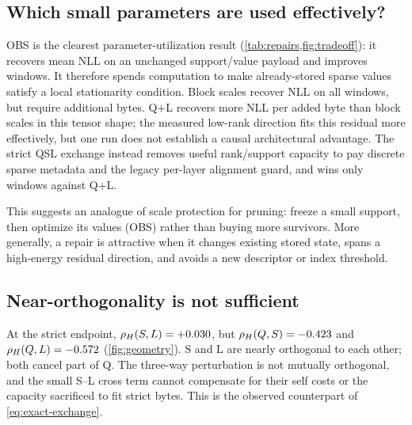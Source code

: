 \subsection{Which small parameters are used effectively?}

\begin{table}[t]
  \caption{Paired repair effects in the same bounded run.  Positive recovery
  favors the left method.  Intervals are descriptive over fixed windows.}
  \label{tab:repairs}
  \centering
  \resizebox{\columnwidth}{!}{}
\end{table}

OBS is the clearest parameter-utilization result
(\cref{tab:repairs,fig:tradeoff}): it recovers \OBSRecovery{} mean NLL on an
unchanged support/value payload and improves \OBSWins{} windows.  It therefore
spends computation to make already-stored sparse values satisfy a local
stationarity condition.  Block scales recover \BlockRecovery{} NLL on all
  windows, but require \BlockExtraBytes{} additional bytes.  Q+L recovers more
  NLL per added byte than block scales in this tensor shape; the measured
  low-rank direction fits this residual more effectively, but one run does not
  establish a causal architectural advantage.  The strict QSL exchange instead
removes useful rank/support capacity to pay discrete sparse metadata and the
legacy per-layer alignment guard, and wins
only \StrictQSLWins{} windows against Q+L.

This suggests an analogue of scale protection for pruning: freeze a small
support, then optimize its values (OBS) rather than buying more survivors.
More generally, a repair is attractive when it changes existing stored state,
spans a high-energy residual direction, and avoids a new descriptor or index
threshold.

\subsection{Near-orthogonality is not sufficient}

At the strict endpoint,
$\rho_H(S,L)=+0.030{}$, but
$\rho_H(Q,S)=-0.423{}$ and
$\rho_H(Q,L)=-0.572{}$ (\cref{fig:geometry}).  S and L are nearly
orthogonal to each other; both cancel part of Q.  The three-way perturbation is
not mutually orthogonal, and the small S--L cross term cannot compensate for
their self costs or the capacity sacrificed to fit strict bytes.  This is the
observed counterpart of \cref{eq:exact-exchange}.

